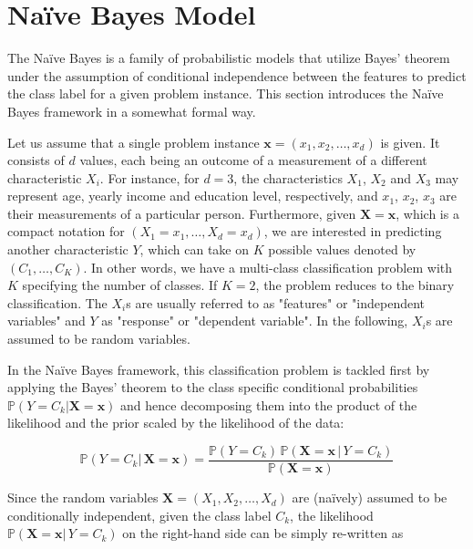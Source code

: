 \documentclass{article}\usepackage[]{graphicx}\usepackage[]{xcolor}
\begin{document}
\section{Na\"ive Bayes Model}

The Na\"ive Bayes is a family of probabilistic models that utilize Bayes' theorem under the assumption of conditional independence between the features to predict the class label for a given problem instance. This section introduces the Na\"ive Bayes framework in a somewhat formal way.

Let us assume that a single problem instance $\boldsymbol{x} = (x_1, x_2, \ldots, x_d)$ is given. It consists of $d$ values, each being an outcome of a measurement of a different characteristic $X_i$. For instance, for $d=3$, the characteristics $X_1$, $X_2$ and $X_3$ may represent age, yearly income and education level, respectively, and $x_1$, $x_2$, $x_3$ are their measurements of a particular person. Furthermore, given $\boldsymbol{X} = \boldsymbol{x}$, which is a compact notation for $(X_1 = x_1,\ldots,X_d = x_d)$, we are interested in predicting another characteristic $Y$, which can take on $K$ possible values denoted by $(C_1,\ldots,C_K)$. In other words, we have a multi-class classification problem with $K$ specifying the number of classes. If $K=2$, the problem reduces to the binary classification. The $X_i$s are usually referred to as "features" or "independent variables" and $Y$ as "response" or "dependent variable". In the following, $X_i$s are assumed to be random variables.

In the Na\"ive Bayes framework, this classification problem is tackled first by applying the Bayes' theorem to the class specific conditional probabilities $\mathbb{P}(Y = C_k | \boldsymbol{X} = \boldsymbol{x})$ and hence decomposing them into the product of the likelihood and the prior scaled by the likelihood of the data:


\begin{equation}
\label{eq:eq1}
 \mathbb{P}(Y = C_k | \,\boldsymbol{X} = \boldsymbol{x}) = \frac{\mathbb{P}(Y = C_k) \, \mathbb{P}(\boldsymbol{X} = \boldsymbol{x} \,| \, Y = C_k)}{ \mathbb{P}(\boldsymbol{X} = \boldsymbol{x})}
\end{equation}


Since the random variables $\boldsymbol{X} = (X_1,X_2,\ldots,X_d)$ are (na\"ively) assumed to be conditionally independent, given the class label $C_k$, the likelihood $\mathbb{P}(\boldsymbol{X} = \boldsymbol{x} | \, Y = C_k)$ on the right-hand side can be simply re-written as
\end{document}
